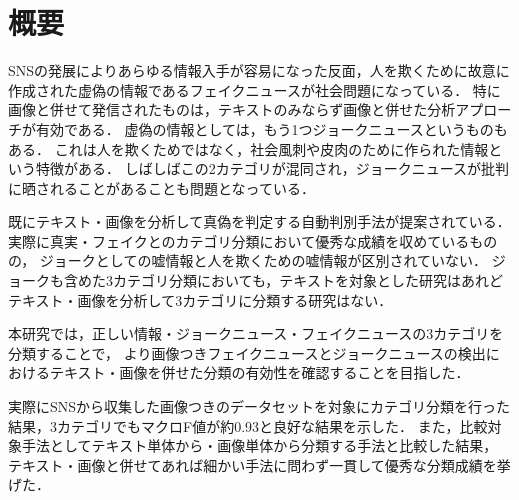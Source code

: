 \chapter{概要}

SNSの発展によりあらゆる情報入手が容易になった反面，人を欺くために故意に作成された虚偽の情報であるフェイクニュースが社会問題になっている．
特に画像と併せて発信されたものは，テキストのみならず画像と併せた分析アプローチが有効である．
虚偽の情報としては，もう1つジョークニュースというものもある．
これは人を欺くためではなく，社会風刺や皮肉のために作られた情報という特徴がある．
しばしばこの2カテゴリが混同され，ジョークニュースが批判に晒されることがあることも問題となっている．

既にテキスト・画像を分析して真偽を判定する自動判別手法が提案されている．
実際に真実・フェイクとのカテゴリ分類において優秀な成績を収めているものの，
ジョークとしての嘘情報と人を欺くための嘘情報が区別されていない．
ジョークも含めた3カテゴリ分類においても，テキストを対象とした研究はあれどテキスト・画像を分析して3カテゴリに分類する研究はない．


本研究では，正しい情報・ジョークニュース・フェイクニュースの3カテゴリを分類することで，
より画像つきフェイクニュースとジョークニュースの検出におけるテキスト・画像を併せた分類の有効性を確認することを目指した．


実際にSNSから収集した画像つきのデータセットを対象にカテゴリ分類を行った結果，3カテゴリでもマクロF値が約0.93と良好な結果を示した．
また，比較対象手法としてテキスト単体から・画像単体から分類する手法と比較した結果，
テキスト・画像と併せてあれば細かい手法に問わず一貫して優秀な分類成績を挙げた．

%